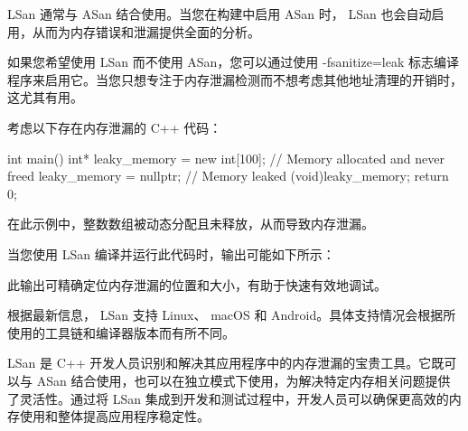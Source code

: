 
LSan 通常与 ASan 结合使用。当您在构建中启用 ASan 时， LSan 也会自动启用，从而为内存错误和泄漏提供全面的分析。


如果您希望使用 LSan 而不使用 ASan，您可以通过使用 -fsanitize=leak 标志编译程序来启用它。当您只想专注于内存泄漏检测而不想考虑其他地址清理的开销时，这尤其有用。


考虑以下存在内存泄漏的 C++ 代码：

\begin{cpp}
int main() {
    int* leaky_memory = new int[100]; // Memory allocated and never
    freed
    leaky_memory = nullptr; // Memory leaked
    (void)leaky_memory;
    return 0;
}
\end{cpp}

在此示例中，整数数组被动态分配且未释放，从而导致内存泄漏。

当您使用 LSan 编译并运行此代码时，输出可能如下所示：


此输出可精确定位内存泄漏的位置和大小，有助于快速有效地调试。


根据最新信息， LSan 支持 Linux、 macOS 和 Android。具体支持情况会根据所使用的工具链和编译器版本而有所不同。

LSan 是 C++ 开发人员识别和解决其应用程序中的内存泄漏的宝贵工具。它既可以与 ASan 结合使用，也可以在独立模式下使用，为解决特定内存相关问题提供了灵活性。通过将 LSan 集成到开发和测试过程中，开发人员可以确保更高效的内存使用和整体提高应用程序稳定性。


